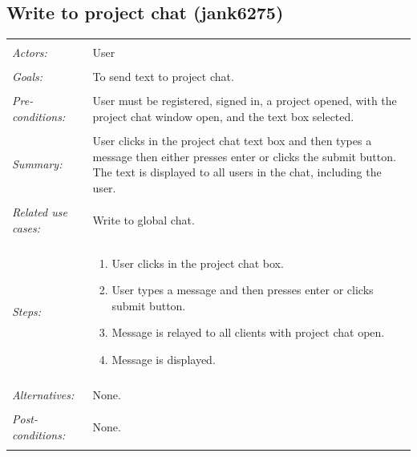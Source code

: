 \documentclass[11pt]{report}
\begin{document}
\subsection{Write to project chat (jank6275)}
\begin{tabular}{ p{2cm} p{12cm} }
 \hline
 \\
 \textit{Actors:} & User \\ 
 \\
 \textit{Goals:} & To send text to project chat. \\
 \\
 \textit{Pre-conditions:} & User must be registered, signed in, a project opened, with the project chat window open, and the text box selected.  \\
 \\
 \textit{Summary:} & User clicks in the project chat text box and then types a message then either presses enter or clicks the submit button. The text is displayed to all users in the chat, including the user. \\ 
 \\
 \textit{Related use cases:} & Write to global chat. \\ 
 \\
 \textit{Steps:} & \begin{enumerate}
  \item User clicks in the project chat box.
  \item User types a message and then presses enter or clicks submit button.
  \item Message is relayed to all clients with project chat open.
  \item Message is displayed.
 \end{enumerate} \\
 \\
 \textit{Alternatives:} & None. \\
 \\
 \textit{Post-conditions:} & None. \\
 \\
\hline
\end{tabular}
\end{document}
